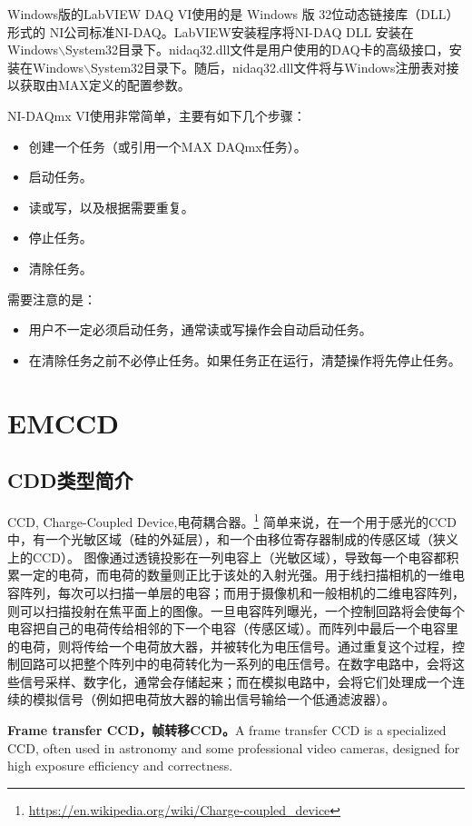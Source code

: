 Windows版的LabVIEW DAQ VI使用的是 Windows 版 32位动态链接库（DLL）形式的 NI公司标准NI-DAQ。LabVIEW安装程序将NI-DAQ DLL 安装在 Windows$\backslash$System32目录下。nidaq32.dll文件是用户使用的DAQ卡的高级接口，安装在Windows$\backslash$System32目录下。随后，nidaq32.dll文件将与Windows注册表对接以获取由MAX定义的配置参数。

NI-DAQmx VI使用非常简单，主要有如下几个步骤：
\begin{itemize}
\item 创建一个任务（或引用一个MAX DAQmx任务）。
\item 启动任务。
\item 读或写，以及根据需要重复。
\item 停止任务。
\item 清除任务。
\end{itemize}
需要注意的是：
\begin{itemize}
\item 用户不一定必须启动任务，通常读或写操作会自动启动任务。
\item 在清除任务之前不必停止任务。如果任务正在运行，清楚操作将先停止任务。
\end{itemize}




\section{EMCCD}
\subsection{CDD类型简介}
CCD, Charge-Coupled Device,电荷耦合器。\footnote{\url{https://en.wikipedia.org/wiki/Charge-coupled_device}}
简单来说，在一个用于感光的CCD中，有一个光敏区域（硅的外延层），和一个由移位寄存器制成的传感区域（狭义上的CCD）。
图像通过透镜投影在一列电容上（光敏区域），导致每一个电容都积累一定的电荷，而电荷的数量则正比于该处的入射光强。用于线扫描相机的一维电容阵列，每次可以扫描一单层的电容；而用于摄像机和一般相机的二维电容阵列，则可以扫描投射在焦平面上的图像。一旦电容阵列曝光，一个控制回路将会使每个电容把自己的电荷传给相邻的下一个电容（传感区域）。而阵列中最后一个电容里的电荷，则将传给一个电荷放大器，并被转化为电压信号。通过重复这个过程，控制回路可以把整个阵列中的电荷转化为一系列的电压信号。在数字电路中，会将这些信号采样、数字化，通常会存储起来；而在模拟电路中，会将它们处理成一个连续的模拟信号（例如把电荷放大器的输出信号输给一个低通滤波器）。

\textbf{Frame transfer CCD，帧转移CCD。}A frame transfer CCD is a specialized CCD, often used in astronomy and some professional video cameras, designed for high exposure efficiency and correctness.

